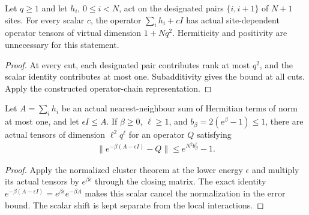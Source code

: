 \begin{lemma}
    \label{lem:local_sum_scalar_mpo}
    \leanok

    Let $q\geq1$ and let $h_i$, $0\leq i<N$, act on the designated
    pairs $\{i,i+1\}$ of $N+1$ sites. For every scalar $c$, the
    operator $\sum_i h_i+cI$ has actual site-dependent operator
    tensors of virtual dimension $1+Nq^2$. Hermiticity and
    positivity are unnecessary for this statement.
\end{lemma}
\begin{proof}\leanok
    At every cut, each designated pair contributes rank at most
    $q^2$, and the scalar identity contributes at most one.
    Subadditivity gives the bound at all cuts. Apply the constructed
    operator-chain representation.
\end{proof}

\begin{lemma}
    \label{thm:shifted_regional_heat_mpo}
    \leanok

    Let $A=\sum_i h_i$ be an actual nearest-neighbour sum of
    Hermitian terms of norm at most one, and let $\epsilon I\leq A$.
    If $\beta\geq0$, $\ell\geq1$, and $b_\beta=2(e^\beta-1)\leq1$,
    there are actual tensors of dimension $\ell^2q^\ell$ for an
    operator $Q$ satisfying
    \begin{align}
        \|e^{-\beta(A-\epsilon I)}-Q\|
        \leq e^{N^2b_\beta^\ell}-1.
        \label{eq:soft_interval_shifted_heat}
    \end{align}
\end{lemma}
\begin{proof}\leanok
    Apply the normalized cluster theorem at the lower energy
    $\epsilon$ and multiply its actual tensors by
    $e^{\beta\epsilon}$ through the closing matrix. The exact
    identity $e^{-\beta(A-\epsilon I)}=e^{\beta\epsilon}e^{-\beta A}$
    makes this scalar cancel the normalization in the error bound.
    The scalar shift is kept separate from the local interactions.
\end{proof}

